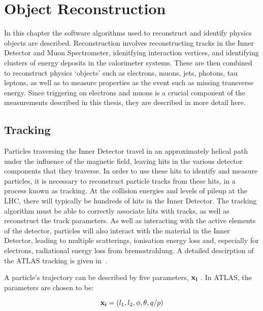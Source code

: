 \graphicspath{{Chapters/Reconstruction/Figures/}}
\chapter{Object Reconstruction}

In this chapter the software algorithms used to reconstruct and identify physics
objects are described. Reconstruction involves reconstructing tracks in the
Inner Detector and Muon Spectrometer, idenitfying interaction vertices,
and identifying clusters of energy deposits in the calorimeter systems. These are
then combined to reconstruct physics `objects' such as electrons, muons, jets, photons,
tau leptons, as well as to measure properties as the event such as missing
transverse energy. 
Since triggering on electrons and muons is a crucial component of the
measurements described in this thesis, they are described in more detail here.

\label{chap:Reconstruction}

\section{Tracking}

Particles traversing the Inner Detector travel in an approximately helical path
under the influence of the magnetic field, leaving hits in the various detector
components that they traverse. In order to use these hits to identify and
measure particles, it is necessary to reconstruct particle tracks from these
hits, in a process known as tracking. At the collision energies and levels of
pileup at the LHC, there will typically be hundreds of hits in the Inner
Detector. The tracking algorithm must be able to correctly associate hits with
tracks, as well as reconstruct the track parameters. As well as interacting with
the active elements of the detector, particles will also interact with the
material in the Inner Detector, leading to multiple scatterings, ionisation
energy loss and, especially for electrons, radiational energy loss from
bremsstrahlung. A detailed descirption of the ATLAS tracking is given
in~\cite{1742-6596-119-3-032014}.

A particle's trajectory can be described by five parameters, $\bf{x_{i}}$ . In ATLAS, the
parameters are chosen to be:

\begin{equation}
{\bf x_{i}} = (l_{1}, l_{2}, \phi, \theta, q/p)
\end{equation}

